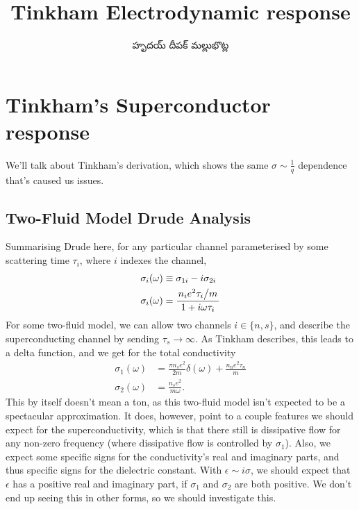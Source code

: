 \documentclass[../main.tex]{subfiles}
\title{Tinkham Electrodynamic response}
\author{\begin{telugu}హృదయ్ దీపక్ మల్లుభొట్ల\end{telugu}}
\date{}
\begin{document}
	\onlyinsubfile{\maketitle}
	\section{Tinkham's Superconductor response} \label{sec:TinkhamResponse}

	We'll talk about Tinkham's derivation\supercite{Tinkham}, which shows the same $\sigma\sim\frac{1}{q}$ dependence that's caused us issues.

	\subsection{Two-Fluid Model Drude Analysis} \label{subsec:twofluid}

	Summarising Drude here, for any particular channel parameterised by some scattering time $\tau_i$, where $i$ indexes the channel,
	\begin{align}
		\sigma_i(\omega) &\equiv \sigma_{1i} - i \sigma_{2i} \\
		\sigma_i(\omega) &= \frac{\flatfrac{n_i e^2 \tau_i}{m}}{1 + i \omega \tau_i} \label{eq:tinkhamdrude}
	\end{align}
	For some two-fluid model, we can allow two channels $i \in \{n, s\}$, and describe the superconducting channel by sending $\tau_s \rightarrow \infty$.
	As Tinkham describes, this leads to a delta function, and we get for the total conductivity
	\begin{align}
		\sigma_1(\omega) &= \frac{\pi n_s e^2}{2m} \delta(\omega) + \frac{n_n e^2 \tau_n}{m} \\
		\sigma_2(\omega) &= \frac{n_s e^2}{m \omega}.
	\end{align}
	This by itself doesn't mean a ton, as this two-fluid model isn't expected to be a spectacular approximation.
	It does, however, point to a couple features we should expect for the superconductivity, which is that there still is dissipative flow for any non-zero frequency (where dissipative flow is controlled by $\sigma_1$).
	Also, we expect some specific signs for the conductivity's real and imaginary parts, and thus specific signs for the dielectric constant.
	With $\epsilon \sim i \sigma$, we should expect that $\epsilon$ has a positive real and imaginary part, if $\sigma_1$ and $\sigma_2$ are both positive.
	We don't end up seeing this in other forms, so we should investigate this.
\end{document}
